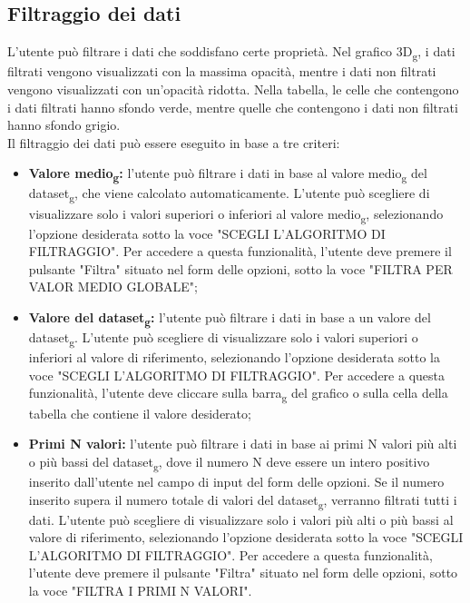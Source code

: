 \subsection{Filtraggio dei dati}
L'utente può filtrare i dati che soddisfano certe proprietà. Nel grafico 3D\textsubscript{g}, i
dati filtrati vengono visualizzati con la massima opacità, mentre i dati non
filtrati vengono visualizzati con un'opacità ridotta. Nella tabella, le celle
che contengono i dati filtrati hanno sfondo verde, mentre quelle che contengono
i dati non filtrati hanno sfondo grigio. \\ Il filtraggio dei dati può essere
eseguito in base a tre criteri:
\begin{itemize}
    \item \textbf{Valore medio\textsubscript{g}:} l'utente può filtrare i dati in base al valore
          medio\textsubscript{g} del dataset\textsubscript{g}, che viene calcolato automaticamente. L'utente può
          scegliere di visualizzare solo i valori superiori o inferiori al valore
          medio\textsubscript{g}, selezionando l'opzione desiderata sotto la voce "SCEGLI
          L'ALGORITMO DI FILTRAGGIO". Per accedere a questa funzionalità, l'utente
          deve premere il pulsante "Filtra" situato nel
          form delle opzioni, sotto la voce "FILTRA PER VALOR MEDIO GLOBALE";
    \item \textbf{Valore del dataset\textsubscript{g}:} l'utente può filtrare i dati in base a un
          valore del dataset\textsubscript{g}. L'utente
          può scegliere di visualizzare solo i valori superiori o inferiori al
          valore di riferimento, selezionando l'opzione desiderata sotto la voce
          "SCEGLI L'ALGORITMO DI FILTRAGGIO". Per accedere a questa funzionalità,
          l'utente deve cliccare sulla barra\textsubscript{g} del grafico o sulla cella della tabella che contiene il
          valore desiderato;
    \item \textbf{Primi N valori:} l'utente può filtrare i dati in base ai primi N
          valori più alti o più bassi del dataset\textsubscript{g}, dove il numero N deve essere un intero positivo
          inserito dall'utente nel campo di input del form delle opzioni. Se il numero inserito supera il numero totale di valori
          del dataset\textsubscript{g}, verranno filtrati tutti i dati. L'utente può scegliere di visualizzare solo i valori
          più alti o più bassi al valore di riferimento, selezionando l'opzione
          desiderata sotto la voce "SCEGLI L'ALGORITMO DI FILTRAGGIO". Per accedere a questa funzionalità,
          l'utente deve premere il pulsante "Filtra" situato nel form delle
          opzioni, sotto la voce "FILTRA I PRIMI N VALORI".
\end{itemize}
